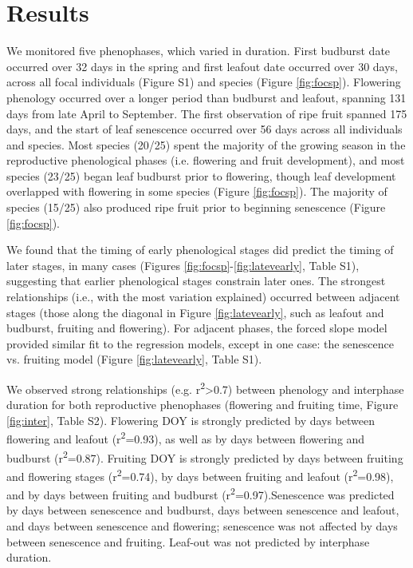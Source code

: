 \documentclass{article}
\begin{document}
\section* {Results}
\par We monitored five phenophases, which varied in duration. First budburst date occurred over 32 days in the spring and first leafout date occurred over 30 days, across all focal individuals (Figure S1) and species (Figure \ref{fig:focsp}). Flowering phenology occurred over a longer period than budburst and leafout, spanning 131 days from late April to September. The first observation of ripe fruit spanned 175 days, and the start of leaf senescence occurred over 56 days across all individuals and species. Most species (20/25) spent the majority of the growing season in the reproductive phenological phases (i.e. flowering and fruit development), and most species (23/25) began leaf budburst prior to flowering, though leaf development overlapped with flowering in some species (Figure \ref{fig:focsp}). The majority of species (15/25) also produced ripe fruit prior to beginning senescence (Figure \ref{fig:focsp}).
\par We found that the timing of early phenological stages did predict the timing of later stages, in many cases (Figures \ref{fig:focsp}-\ref{fig:latevearly}, Table S1), suggesting that earlier phenological stages constrain later ones. The strongest relationships (i.e., with the most variation explained) occurred between adjacent stages (those along the diagonal in Figure \ref{fig:latevearly}, such as leafout and budburst, fruiting and flowering). For adjacent phases, the forced slope model provided similar fit to the regression models, except in one case: the senescence vs. fruiting model (Figure \ref{fig:latevearly}, Table S1). 

\par We observed strong relationships (e.g. r\textsuperscript{2}>0.7) between phenology and interphase duration for both reproductive phenophases (flowering and fruiting time, Figure \ref{fig:inter}, Table S2). Flowering DOY is strongly predicted by days between flowering and leafout (r\textsuperscript{2}=0.93), as well as by days between flowering and budburst (r\textsuperscript{2}=0.87). Fruiting DOY is strongly predicted by days between fruiting and flowering stages (r\textsuperscript{2}=0.74), by days between fruiting and leafout (r\textsuperscript{2}=0.98), and by days between fruiting and budburst (r\textsuperscript{2}=0.97).Senescence was predicted by days between senescence and budburst, days between senescence and leafout, and days between senescence and flowering; senescence was not affected by days between senescence and fruiting.  Leaf-out was not predicted by interphase duration. 
\end{document}
